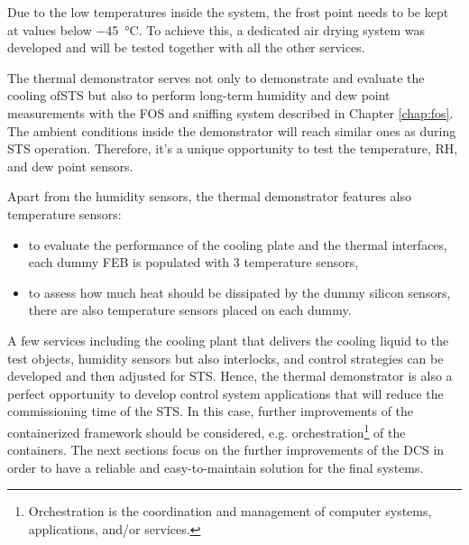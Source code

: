  Due to the low temperatures inside the system, the frost point needs to be kept at values below \SI{-45}{\celsius}. To achieve this, a dedicated air drying system was developed and will be tested together with all the other services. 
 
 The thermal demonstrator serves not only to demonstrate and evaluate the cooling of\gls{STS} but also to perform long-term humidity and dew point measurements with the \gls{FOS} and sniffing system described in Chapter \ref{chap:fos}. The ambient conditions inside the demonstrator will reach similar ones as during \gls{STS} operation. Therefore, it's a unique opportunity to test the temperature, RH, and dew point sensors.
 
 Apart from the humidity sensors, the thermal demonstrator features also temperature sensors:
 \begin{itemize}
     \item to evaluate the performance of the cooling plate and the thermal interfaces, each dummy \gls{FEB} is populated with 3 temperature sensors,
     \item to assess how much heat should be dissipated by the dummy silicon sensors, there are also temperature sensors placed on each dummy.
 \end{itemize}

A few services including the cooling plant that delivers the cooling liquid to the test objects, humidity sensors but also interlocks, and control strategies can be developed and then adjusted for \gls{STS}. Hence, the thermal demonstrator is also a perfect opportunity to develop control system applications that will reduce the commissioning time of the \gls{STS}. In this case, further improvements of the containerized framework should be considered, e.g. orchestration\footnote{Orchestration is the coordination and management of computer systems, applications, and/or services.} of the containers. The next sections focus on the further improvements of the \gls{DCS} in order to have a reliable and easy-to-maintain solution for the final systems. 
